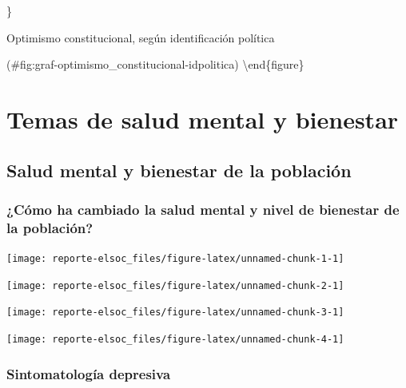 \documentclass[
  12pt,
]{book}
\begin{document}
\}

\caption{Optimismo constitucional, según identificación política}

(\#fig:graf-optimismo\_constitucional-idpolitica)
\textbackslash end\{figure\}

\hypertarget{temas-de-salud-mental-y-bienestar}{%
\chapter{Temas de salud mental y bienestar}\label{temas-de-salud-mental-y-bienestar}}

\hypertarget{salud-mental-y-bienestar-de-la-poblaciuxf3n}{%
\section{Salud mental y bienestar de la población}\label{salud-mental-y-bienestar-de-la-poblaciuxf3n}}

\hypertarget{cuxf3mo-ha-cambiado-la-salud-mental-y-nivel-de-bienestar-de-la-poblaciuxf3n}{%
\subsection{¿Cómo ha cambiado la salud mental y nivel de bienestar de la población?}\label{cuxf3mo-ha-cambiado-la-salud-mental-y-nivel-de-bienestar-de-la-poblaciuxf3n}}

\begin{center}\texttt{[image: reporte-elsoc\_files/figure-latex/unnamed-chunk-1-1]} \end{center}

\begin{center}\texttt{[image: reporte-elsoc\_files/figure-latex/unnamed-chunk-2-1]} \end{center}

\begin{center}\texttt{[image: reporte-elsoc\_files/figure-latex/unnamed-chunk-3-1]} \end{center}

\begin{center}\texttt{[image: reporte-elsoc\_files/figure-latex/unnamed-chunk-4-1]} \end{center}

\hypertarget{sintomatologuxeda-depresiva}{%
\subsection{Sintomatología depresiva}\label{sintomatologuxeda-depresiva}}
\end{document}
